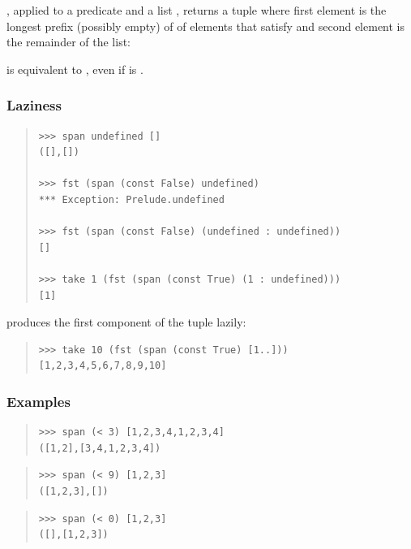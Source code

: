 \begin{haddockdesc}
\item[\begin{tabular}{@{}l}
span :: (a -> Bool) -> {\char 91}a{\char 93} -> ({\char 91}a{\char 93}, {\char 91}a{\char 93})
\end{tabular}]
{\haddockbegindoc
{}, applied to a predicate  and a list , returns a tuple where
 first element is the longest prefix (possibly empty) of  of elements that
 satisfy  and second element is the remainder of the list:\par
{}  is equivalent to , even if  is .\par
\subsubsection*{\textbf{Laziness}}
\begin{quote}
{\haddockverb\begin{verbatim}
>>> span undefined []
([],[])

>>> fst (span (const False) undefined)
*** Exception: Prelude.undefined

>>> fst (span (const False) (undefined : undefined))
[]

>>> take 1 (fst (span (const True) (1 : undefined)))
[1]

\end{verbatim}}
\end{quote}
 produces the first component of the tuple lazily:\par
\begin{quote}
{\haddockverb\begin{verbatim}
>>> take 10 (fst (span (const True) [1..]))
[1,2,3,4,5,6,7,8,9,10]

\end{verbatim}}
\end{quote}
\subsubsection*{\textbf{Examples}}
\begin{quote}
{\haddockverb\begin{verbatim}
>>> span (< 3) [1,2,3,4,1,2,3,4]
([1,2],[3,4,1,2,3,4])

\end{verbatim}}
\end{quote}
\begin{quote}
{\haddockverb\begin{verbatim}
>>> span (< 9) [1,2,3]
([1,2,3],[])

\end{verbatim}}
\end{quote}
\begin{quote}
{\haddockverb\begin{verbatim}
>>> span (< 0) [1,2,3]
([],[1,2,3])

\end{verbatim}}
\end{quote}}
\end{haddockdesc}
